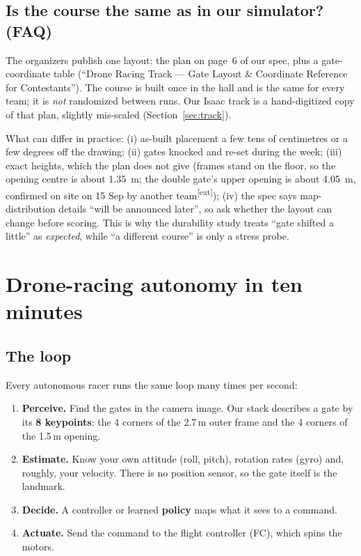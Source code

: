 \documentclass[10pt,a4paper]{article}
\newcommand{\X}{\textsuperscript{\textcolor{ink}{[ext]}}}
\begin{document}
\subsection{Is the course the same as in our simulator? (FAQ)}
\begin{explain}
The organizers publish one layout: the plan on page~6 of our spec, plus a gate-coordinate table (``Drone Racing Track --- Gate Layout \& Coordinate Reference for Contestants'').
The course is built once in the hall and is the same for every team; it is \emph{not} randomized between runs. Our Isaac track is a hand-digitized copy of that plan, slightly mis-scaled (Section~\ref{sec:track}).

What can differ in practice:
(i) as-built placement a few tens of centimetres or a few degrees off the drawing;
(ii) gates knocked and re-set during the week;
(iii) exact heights, which the plan does not give (frames stand on the floor, so the opening centre is about \SI{1.35}{m}; the double gate's upper opening is about \SI{4.05}{m}, confirmed on site on 15 Sep by another team\X);
(iv) the spec says map-distribution details ``will be announced later'', so ask whether the layout can change before scoring.
This is why the durability study treats ``gate shifted a little'' as \emph{expected}, while ``a different course'' is only a stress probe.
\end{explain}

\section{Drone-racing autonomy in ten minutes}

\subsection{The loop}
Every autonomous racer runs the same loop many times per second:
\begin{enumerate}
\item \textbf{Perceive.} Find the gates in the camera image. Our stack describes a gate by its \textbf{8 keypoints}: the 4 corners of the 2.7\,m outer frame and the 4 corners of the 1.5\,m opening.
\item \textbf{Estimate.} Know your own attitude (roll, pitch), rotation rates (gyro) and, roughly, your velocity. There is no position sensor, so the gate itself is the landmark.
\item \textbf{Decide.} A controller or learned \textbf{policy} maps what it sees to a command.
\item \textbf{Actuate.} Send the command to the flight controller (FC), which spins the motors.
\end{enumerate}
\end{document}
